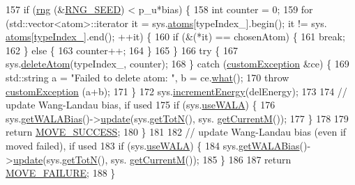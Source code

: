 \begin{DoxyCode}
157     \textcolor{keywordflow}{if} (\hyperlink{utilities_8cpp_a0f9542af4b475ac79cb679d7a8d14db0}{rng} (&\hyperlink{global_8h_a3f4e4ea24d5a5c66feae55d1f329c884}{RNG\_SEED}) < p\_u*bias) \{
158         \textcolor{keywordtype}{int} counter = 0;
159         \textcolor{keywordflow}{for} (std::vector<atom>::iterator it = sys.\hyperlink{classsim_system_a90421b19082f7fb8fc23b7264b1161e4}{atoms}[typeIndex\_].begin(); it != sys.
      \hyperlink{classsim_system_a90421b19082f7fb8fc23b7264b1161e4}{atoms}[\hyperlink{classmc_move_acb731965547b0326ef318ec96da8b46a}{typeIndex\_}].end(); ++it) \{
160             \textcolor{keywordflow}{if} (&(*it) == chosenAtom) \{
161                 \textcolor{keywordflow}{break};
162             \} \textcolor{keywordflow}{else} \{
163                 counter++;
164             \}
165         \}
166             \textcolor{keywordflow}{try} \{
167                     sys.\hyperlink{classsim_system_acabf4fc5b5b90bba62e1449ddb3646c6}{deleteAtom}(typeIndex\_, counter);
168             \} \textcolor{keywordflow}{catch} (\hyperlink{classcustom_exception}{customException} &ce) \{
169                     std::string a = \textcolor{stringliteral}{"Failed to delete atom: "}, b = ce.\hyperlink{classcustom_exception_aeb6ab5848b038adfc68fde86a512f691}{what}();
170                     \textcolor{keywordflow}{throw} \hyperlink{classcustom_exception}{customException} (a+b);
171             \}
172         sys.\hyperlink{classsim_system_a6ad31c08955b80873f865b3069618dcb}{incrementEnergy}(delEnergy);
173 
174         \textcolor{comment}{// update Wang-Landau bias, if used}
175         \textcolor{keywordflow}{if} (sys.\hyperlink{classsim_system_aa83b00006b3919fb6e13f1bdeadece6a}{useWALA}) \{
176             sys.\hyperlink{classsim_system_a7cb5049de8b0988349e89e30e4000407}{getWALABias}()->\hyperlink{classwala_ab439e3f60bea6c54522a870b9ad67acf}{update}(sys.\hyperlink{classsim_system_a37dd827f4057049763351510147b9f1d}{getTotN}(), sys.
      \hyperlink{classsim_system_a299fe4372e610b554eaaf5f5957b2dbc}{getCurrentM}());
177         \}
178 
179             \textcolor{keywordflow}{return} \hyperlink{moves_8h_ae8285cbddc5d21f73f49dcbad82a775a}{MOVE\_SUCCESS};
180         \}
181 
182     \textcolor{comment}{// update Wang-Landau bias (even if moved failed), if used}
183     \textcolor{keywordflow}{if} (sys.\hyperlink{classsim_system_aa83b00006b3919fb6e13f1bdeadece6a}{useWALA}) \{
184         sys.\hyperlink{classsim_system_a7cb5049de8b0988349e89e30e4000407}{getWALABias}()->\hyperlink{classwala_ab439e3f60bea6c54522a870b9ad67acf}{update}(sys.\hyperlink{classsim_system_a37dd827f4057049763351510147b9f1d}{getTotN}(), sys.
      \hyperlink{classsim_system_a299fe4372e610b554eaaf5f5957b2dbc}{getCurrentM}());
185     \}
186 
187     \textcolor{keywordflow}{return} \hyperlink{moves_8h_a9832cf5fcfa8c0894545b591c9908e39}{MOVE\_FAILURE};
188 \}
\end{DoxyCode}


